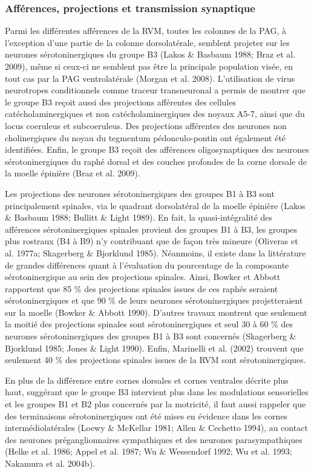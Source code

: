\documentclass[a4paper,12pt,twoside]{report}
\begin{document}
\clearpage

\subsubsection{Afférences, projections et transmission synaptique}
\label{Afférences, proj, transmission}

Parmi les différentes afférences de la RVM, toutes les colonnes de la PAG, à l’exception d’une partie de la colonne dorsolatérale, semblent projeter sur les neurones sérotoninergiques du groupe B3 (Lakos \& Basbaum 1988; Braz et al. 2009), même si ceux-ci ne semblent pas être la principale population visée, en tout cas par la PAG ventrolatérale (Morgan et al. 2008). L’utilisation de virus neurotropes conditionnels comme traceur transneuronal a permis de montrer que le groupe B3 reçoit aussi des projections afférentes des cellules catécholaminergiques et non catécholaminergiques des noyaux A5-7, ainsi que du locus coeruleus et subcoeruleus. Des projections afférentes des neurones non cholinergiques du noyau du tegmentum pédonculo-pontin ont également été identifiées. Enfin, le groupe B3 reçoit des afférences oligosynaptiques des neurones sérotoninergiques du raphé dorsal et des couches profondes de la corne dorsale de la moelle épinière (Braz et al. 2009).

Les projections des neurones sérotoninergiques des groupes B1 à B3 sont principalement spinales, via le quadrant dorsolatéral de la moelle épinière (Lakos \& Basbaum 1988; Bullitt \& Light 1989). En fait, la quasi-intégralité des afférences sérotoninergiques spinales provient des groupes B1 à B3, les groupes plus rostraux (B4 à B9) n’y contribuant que de façon très mineure (Oliveras et al. 1977a; Skagerberg \& Bjorklund 1985). Néanmoins, il existe dans la littérature de grandes différences quant à l’évaluation du pourcentage de la composante sérotoninergique au sein des projections spinales. Ainsi, Bowker et Abbott rapportent que 85 \% des projections spinales issues de ces raphés seraient sérotoninergiques et que 90 \% de leurs neurones sérotoninergiques projetteraient sur la moelle (Bowker \& Abbott 1990). D’autres travaux montrent que seulement la moitié des projections spinales sont sérotoninergiques et seul 30 à 60 \% des neurones sérotoninergiques des groupes B1 à B3 sont concernés (Skagerberg \& Bjorklund 1985; Jones \& Light 1990). Enfin, Marinelli et al. (2002) trouvent que seulement 40 \% des projections spinales issues de la RVM sont sérotoninergiques.

En plus de la différence entre cornes dorsales et cornes ventrales décrite plus haut, suggérant que le groupe B3 intervient plus dans les modulations sensorielles et les groupes B1 et B2 plus concernés par la motricité, il faut aussi rappeler que des terminaisons sérotoninergiques ont été mises en évidence dans les cornes intermédiolatérales (Loewy \& McKellar 1981; Allen \& Cechetto 1994), au contact des neurones préganglionnaires sympathiques et des neurones parasympathiques (Helke et al. 1986; Appel et al. 1987; Wu \& Wessendorf 1992; Wu et al. 1993; Nakamura et al. 2004b).
\end{document}
